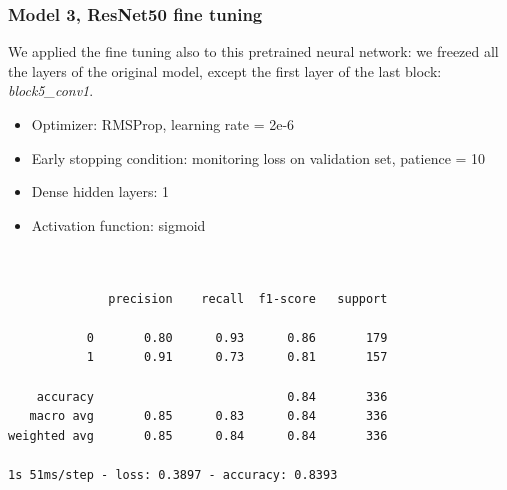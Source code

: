 \documentclass{article}
\begin{document}
\subsubsection{Model 3, ResNet50 fine tuning}
We applied the fine tuning also to this pretrained neural network: we freezed all the layers of the original model, except the first layer of the last block: \textit{block5\_conv1}.

\begin{itemize}
\item Optimizer: RMSProp, learning rate = 2e-6
\item Early stopping condition: monitoring loss on validation set, patience = 10
\item Dense hidden layers: 1
\item Activation function: sigmoid
\end{itemize}

\begin{verbatim}


              precision    recall  f1-score   support

           0       0.80      0.93      0.86       179
           1       0.91      0.73      0.81       157

    accuracy                           0.84       336
   macro avg       0.85      0.83      0.84       336
weighted avg       0.85      0.84      0.84       336

1s 51ms/step - loss: 0.3897 - accuracy: 0.8393

\end{verbatim}
\end{document}

